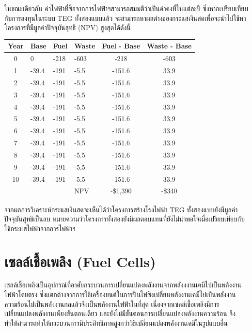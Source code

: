 \message{ !name(solar.tex)}\documentclass[
a4paper,
svgnames,
openany,
justified,
]{tufte-book}
\begin{document}
\begin{เฉลย}
  ในขณะเดียวกัน ค่าไฟฟ้าที่ซื้อจากการไฟฟ้าฯสามารถสมมติว่าเป็นค่าคงที่ในแต่ละปี ซึ่งหากเปรียบเทียบกับการลงทุนในระบบ TEG ทั้งสองแบบแล้ว จะสามารถหาผลต่างของกระแสเงินสดเพื่อจะนำไปใช้หาโครงการที่มีมูลค่าปัจจุบันสุทธิ (NPV) สูงสุดได้ดังนี้
  
  \begin{tabular}{clllcc}
    \toprule
    Year & Base  & Fuel & Waste & Fuel - Base & Waste - Base \\
    \midrule
    0    & 0     & -218 & -603  & -218        & -603         \\
    1    & -39.4 & -191 & -5.5  & -151.6      & 33.9         \\
    2    & -39.4 & -191 & -5.5  & -151.6      & 33.9         \\
    3    & -39.4 & -191 & -5.5  & -151.6      & 33.9         \\
    4    & -39.4 & -191 & -5.5  & -151.6      & 33.9         \\
    5    & -39.4 & -191 & -5.5  & -151.6      & 33.9         \\
    6    & -39.4 & -191 & -5.5  & -151.6      & 33.9         \\
    7    & -39.4 & -191 & -5.5  & -151.6      & 33.9         \\
    8    & -39.4 & -191 & -5.5  & -151.6      & 33.9         \\
    9    & -39.4 & -191 & -5.5  & -151.6      & 33.9         \\
    10   & -39.4 & -191 & -5.5  & -151.6      & 33.9         \\
    \midrule
         &       &      & NPV   & -\$1,390    & -\$340       \\
    \bottomrule
  \end{tabular}

  จากผลการวิเคราะห์กระแสเงินสดจะเห็นได้ว่าโครงการสร้างโรงไฟฟ้า TEG ทั้งสองแบบยังมีมูลค่าปัจจุบันสุทธิเป็นลบ หมายความว่าโครงการทั้งสองยังมีผลตอบแทนที่ยังไม่น่าพอใจเมื่อเปรียบเทียบกับใช้กระแสไฟฟ้าจากการไฟฟ้าฯ
\end{เฉลย}

\chapter{เซลล์เชื้อเพลิง (Fuel Cells)}

เซลล์เชื้อเพลิงเป็นอุปกรณ์ที่อาศัยกระบวนการเปลี่ยนแปลงพลังงานจากพลังงงานเคมีไปเป็นพลังงานไฟฟ้าโดยตรง ซึ่งแตกต่างจากการใช้เครื่องยนต์ในการปั่นไฟซึ่งเปลี่ยนพลังงานเคมีไปเป็นพลังงานความร้อนไปเป็นพลังงานกลแล้วจึงเป็นพลังงานไฟฟ้าในที่สุด เนื่องจากเซลล์เชื้อเพลิงมีการเปลี่ยนแปลงพลังงานเพียงขั้นตอนเดียว และยังไม่มีขั้นตอนการเปลี่ยนแปลงพลังงานความร้อน จึงทำให้สามารถทำให้กระบวนการมีประสิทธิภาพสูงกว่าวิธีเปลี่ยนแปลงพลังงานเคมีในรูปแบบอื่น
\end{document}
